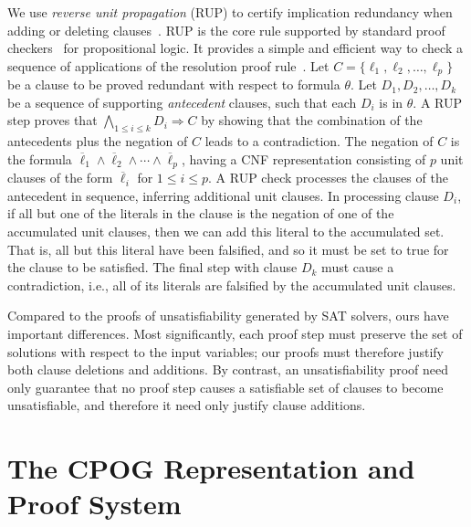 \documentclass[letterpaper,USenglish,cleveref, autoref, thm-restate]{lipics-v2021}
\newcommand{\obar}[1]{\overline{#1}}
\newcommand{\lit}{\ell}
\newcommand{\imply}{\Rightarrow}
\begin{document}
We use \emph{reverse unit propagation} (RUP) to certify
implication redundancy when adding or deleting
clauses~\cite{goldberg,vangelder08_verifying_rup_proofs}.
RUP
is the core rule supported by standard
proof checkers~\cite{heule:cade:2013,wetzler14_drattrim} for propositional logic. It provides a simple and efficient
way to check a sequence of applications of the resolution proof rule~\cite{robinson-1965}.
Let $C = \{\lit_1, \lit_2, \ldots,\lit_p\}$ be a clause to be
proved redundant with respect to formula $\theta$.  Let $D_1, D_2, \ldots, D_k$ be a sequence of supporting
\emph{antecedent} clauses, such that each $D_i$ is in $\theta$.
A RUP step
proves that $\bigwedge_{1\leq i \leq k} D_i \imply C$ by showing
that the combination of the antecedents plus the negation of $C$ leads
to a contradiction.  The negation of $C$ is the formula
$\overline{\lit}_1 \land \overline{\lit}_2 \land \cdots \land
\overline{\lit}_p$, having a CNF representation consisting of $p$ unit
clauses of the form $\obar{\lit}_i$ for $1 \leq i \leq p$.  A RUP
check processes the clauses of the antecedent in sequence, inferring
additional unit clauses.  In processing clause $D_i$, if all but one
of the literals in the clause is the negation of one of the
accumulated unit clauses, then we can add this literal to the
accumulated set.  That is, all but this literal have been falsified,
and so it must be set to true for the clause to be satisfied.  The
final step with clause $D_k$ must cause a contradiction, i.e., all of
its literals are falsified by the accumulated unit clauses.

Compared to the proofs of unsatisfiability generated by SAT solvers,
ours have important differences.  Most
significantly, each proof step must preserve the set of solutions with respect to the input variables;
our proofs must therefore justify both clause deletions and additions.
By contrast, an unsatisfiability proof need only guarantee that
no proof step causes a satisfiable set of clauses to become
unsatisfiable, and therefore it need only justify clause additions.


\section{The CPOG Representation and Proof System}
\label{sect:cpog}
\end{document}
